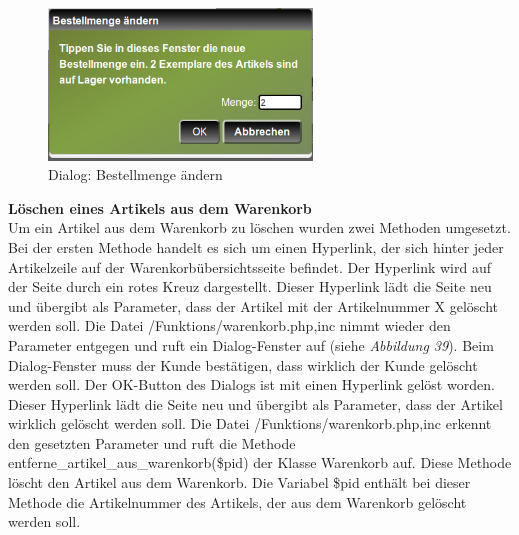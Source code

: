 \begin{figure}[H]
	\begin{center}
			\includegraphics[width=70mm]{Bilder/mengenaenderung.png}
	\end{center}
	\caption{Dialog: Bestellmenge ändern}
\end{figure}

\textbf{Löschen eines Artikels aus dem Warenkorb}\\
Um ein Artikel aus dem Warenkorb zu löschen wurden zwei Methoden umgesetzt. Bei der ersten Methode handelt es sich um einen Hyperlink, der sich hinter jeder Artikelzeile auf der Warenkorbübersichtsseite befindet. Der Hyperlink wird auf der Seite durch ein rotes Kreuz dargestellt. Dieser Hyperlink lädt die Seite neu und übergibt als Parameter, dass der Artikel mit der Artikelnummer X gelöscht werden soll. Die Datei \glqq /Funktions/warenkorb.php,inc\grqq{} nimmt wieder den Parameter entgegen und ruft ein Dialog-Fenster auf (siehe \textit{Abbildung 39}). Beim Dialog-Fenster muss der Kunde bestätigen, dass wirklich der Kunde gelöscht werden soll. Der \glqq OK-Button\grqq{} des Dialogs ist mit einen Hyperlink gelöst worden. Dieser Hyperlink lädt die Seite neu und übergibt als Parameter, dass der Artikel wirklich gelöscht werden soll. Die Datei \glqq /Funktions/warenkorb.php,inc\grqq{} erkennt den gesetzten Parameter und ruft die Methode \glqq entferne\_artikel\_aus\_warenkorb(\$pid)\grqq{} der Klasse \glqq Warenkorb\grqq{} auf. Diese Methode löscht den Artikel aus dem Warenkorb. Die Variabel \glqq \$pid\grqq{} enthält bei dieser Methode die Artikelnummer des Artikels, der aus dem Warenkorb gelöscht werden soll.\\

